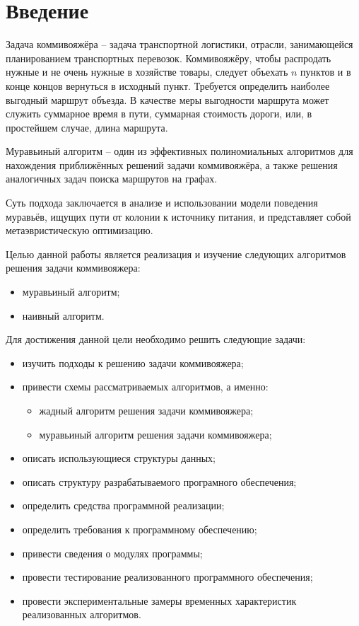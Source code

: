\chapter*{Введение}

Задача коммивояжёра – задача транспортной логистики, отрасли, занимающейся планированием транспортных перевозок. Коммивояжёру, чтобы распродать нужные и не очень нужные в хозяйстве товары, следует объехать $n$ пунктов и в конце концов вернуться в исходный пункт. Требуется определить наиболее выгодный маршрут объезда. В качестве меры выгодности маршрута может служить суммарное время в пути, суммарная стоимость дороги, или, в простейшем случае, длина маршрута.

Муравьиный алгоритм – один из эффективных полиномиальных алгоритмов для нахождения приближённых решений задачи коммивояжёра, а также решения аналогичных задач поиска маршрутов на графах. 

Суть подхода заключается в анализе и использовании модели поведения муравьёв, ищущих пути от колонии к источнику питания, и представляет собой метаэвристическую оптимизацию.

Целью данной работы является реализация и изучение следующих алгоритмов решения задачи коммивояжера:
\begin{itemize}
	\item муравьиный алгоритм;
	\item наивный алгоритм.
\end{itemize}

Для достижения данной цели необходимо решить следующие задачи:

\begin{itemize}
    \item изучить подходы к решению задачи коммивояжера;
    \item привести схемы рассматриваемых алгоритмов, а именно:
	\begin{itemize}
	    \item жадный алгоритм решения задачи коммивояжера;
	    \item муравьиный алгоритм решения задачи коммивояжера;
	\end{itemize}
	\item описать использующиеся структуры данных;
	\item описать структуру разрабатываемого програмного обеспечения;
	\item определить средства программной реализации;
	\item определить требования к программному обеспечению;
	\item привести сведения о модулях программы;
	\item провести тестирование реализованного программного обеспечения;
	\item провести экспериментальные замеры временных характеристик реализованных алгоритмов.
\end{itemize}

